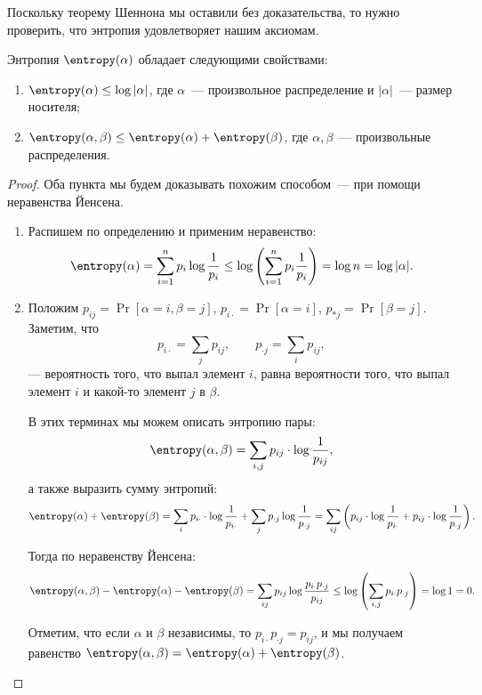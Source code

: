 Поскольку теорему Шеннона мы оставили без доказательства, то нужно проверить, что энтропия удовлетворяет
нашим аксиомам.
\begin{proposition}
    Энтропия $\entropy(\alpha)$ обладает следующими свойствами:
    \begin{enumerate}
        \item $\entropy(\alpha) \le \log |\alpha|$, где $\alpha$~--- произвольное распределение и
            $|\alpha|$~--- размер носителя;
        \item $\entropy(\alpha, \beta) \le \entropy(\alpha) + \entropy(\beta)$, где $\alpha, \beta$~---
            произвольные распределения.
    \end{enumerate}
\end{proposition}

\begin{proof}
    Оба пункта мы будем доказывать похожим способом~--- при помощи неравенства Йенсена.
    \begin{enumerate}
        \item Распишем по определению и применим неравенство:
            $$
                \entropy(\alpha) = \sum_{i = 1}^n p_i \log \frac{1}{p_i} \le
                \log\left(\sum_{i = 1}^n p_i \frac{1}{p_i} \right) = \log{n}
                = \log |\alpha|.
            $$
        \item Положим $p_{ij} = \Pr[\alpha = i, \beta = j]$, $p_{i \cdot} = \Pr[\alpha = i]$, $p_{*j} =
            \Pr[\beta = j]$. Заметим, что
            $$
                p_{i \cdot} = \sum_{j} p_{ij},\qquad p_{\cdot j} = \sum_{i}p_{ij},
            $$
            --- вероятность того, что выпал элемент $i$, равна вероятности того, что выпал элемент $i$ и
            какой-то элемент $j$ в $\beta$.

            В этих терминах мы можем описать энтропию пары:
            $$
                \entropy(\alpha, \beta) = \sum_{i, j} p_{ij} \cdot \log \frac{1}{p_{ij}},
            $$
            а также выразить сумму энтропий:
            $$
                \entropy(\alpha) + \entropy(\beta) = \sum_i p_{i \cdot} \cdot \log \frac{1}{p_{i \cdot}}
                + \sum_j p_{\cdot j} \log\frac{1}{p_{\cdot j}} =
                \sum_{ij} \left(p_{ij} \cdot \log \frac{1}{p_{i\cdot}} +
                p_{ij} \cdot \log \frac{1}{p_{\cdot j}} \right).
            $$

            Тогда по неравенству Йенсена:
            $$
                \entropy(\alpha, \beta) - \entropy(\alpha) - \entropy(\beta) =
                \sum_{ij} p_{ij} \log \frac{p_{i \cdot} p_{\cdot j}}{p_{ij}} \le
                \log\left( \sum_{i, j} p_{i \cdot} p_{\cdot j} \right) = \log 1 = 0.
            $$

            Отметим, что если $\alpha$ и $\beta$ независимы, то $p_{i \cdot} p_{\cdot j} = p_{ij}$, и мы
            получаем равенство $\entropy(\alpha, \beta) = \entropy(\alpha) + \entropy(\beta)$. 
    \end{enumerate}
\end{proof}

